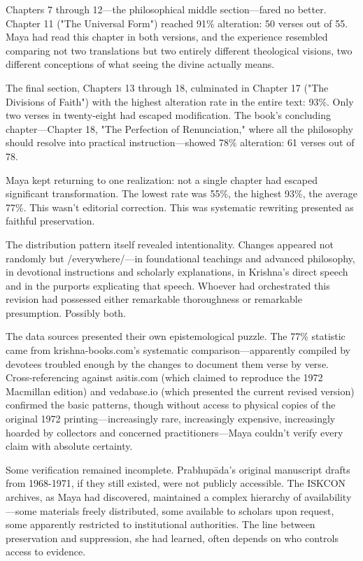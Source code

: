 \documentclass[12pt,twoside]{book}
\begin{document}
Chapters 7 through 12—the philosophical middle section—fared no better. Chapter 11 ("The Universal Form") reached 91\% alteration: 50 verses out of 55. Maya had read this chapter in both versions, and the experience resembled comparing not two translations but two entirely different theological visions, two different conceptions of what seeing the divine actually means.

The final section, Chapters 13 through 18, culminated in Chapter 17 ("The Divisions of Faith") with the highest alteration rate in the entire text: 93\%. Only two verses in twenty-eight had escaped modification. The book's concluding chapter—Chapter 18, "The Perfection of Renunciation," where all the philosophy should resolve into practical instruction—showed 78\% alteration: 61 verses out of 78.

Maya kept returning to one realization: not a single chapter had escaped significant transformation. The lowest rate was 55\%, the highest 93\%, the average 77\%. This wasn't editorial correction. This was systematic rewriting presented as faithful preservation.

The distribution pattern itself revealed intentionality. Changes appeared not randomly but /everywhere/—in foundational teachings and advanced philosophy, in devotional instructions and scholarly explanations, in Krishna's direct speech and in the purports explicating that speech. Whoever had orchestrated this revision had possessed either remarkable thoroughness or remarkable presumption. Possibly both.

The data sources presented their own epistemological puzzle. The 77\% statistic came from krishna-books.com's systematic comparison—apparently compiled by devotees troubled enough by the changes to document them verse by verse. Cross-referencing against asitis.com (which claimed to reproduce the 1972 Macmillan edition) and vedabase.io (which presented the current revised version) confirmed the basic patterns, though without access to physical copies of the original 1972 printing—increasingly rare, increasingly expensive, increasingly hoarded by collectors and concerned practitioners—Maya couldn't verify every claim with absolute certainty.

Some verification remained incomplete. Prabhupāda's original manuscript drafts from 1968-1971, if they still existed, were not publicly accessible. The ISKCON archives, as Maya had discovered, maintained a complex hierarchy of availability—some materials freely distributed, some available to scholars upon request, some apparently restricted to institutional authorities. The line between preservation and suppression, she had learned, often depends on who controls access to evidence.
\end{document}
